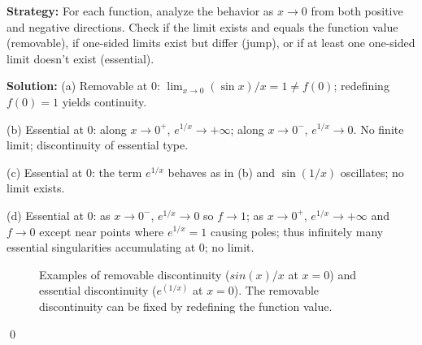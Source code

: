\noindent\textbf{Strategy:} For each function, analyze the behavior as $x \to 0$ from both positive and negative directions. Check if the limit exists and equals the function value (removable), if one-sided limits exist but differ (jump), or if at least one one-sided limit doesn't exist (essential).

\bigskip\noindent\textbf{Solution:}
(a) Removable at $0$: $\lim_{x\to0}(\sin x)/x=1\ne f(0)$; redefining $f(0)=1$ yields continuity.

(b) Essential at $0$: along $x\to 0^+$, $e^{1/x}\to+\infty$; along $x\to0^-$, $e^{1/x}\to 0$. No finite limit; discontinuity of essential type.

(c) Essential at $0$: the term $e^{1/x}$ behaves as in (b) and $\sin(1/x)$ oscillates; no limit exists.

(d) Essential at $0$: as $x\to0^-$, $e^{1/x}\to0$ so $f\to 1$; as $x\to0^+$, $e^{1/x}\to+\infty$ and $f\to 0$ except near points where $e^{1/x}=1$ causing poles; thus infinitely many essential singularities accumulating at $0$; no limit.

\begin{figure}[h]
\centering
{}
\caption{Examples of removable discontinuity ($sin(x)/x$ at $x=0$) and essential discontinuity ($e^(1/x)$ at $x=0$). The removable discontinuity can be fixed by redefining the function value.}
\end{figure}\qed




